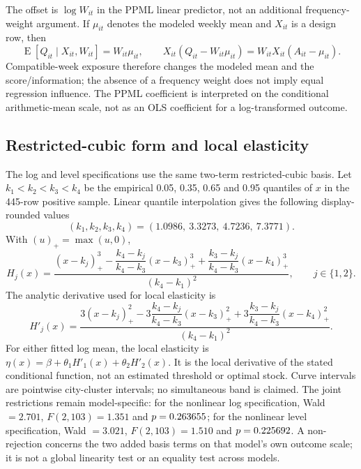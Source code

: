 The offset is $\log W_{it}$ in the PPML linear predictor, not an additional
frequency-weight argument.  If $\mu_{it}$ denotes the modeled weekly mean and
$X_{it}$ is a design row, then
\begin{equation}
 \operatorname{E}[Q_{it}\mid X_{it},W_{it}]=W_{it}\mu_{it},\qquad
 X_{it}(Q_{it}-W_{it}\mu_{it})
 =W_{it}X_{it}(A_{it}-\mu_{it}).
 \label{eq:si-offset-equivalence}
\end{equation}
Compatible-week exposure therefore changes the modeled mean and the
score/information; the absence of a frequency weight does not imply equal
regression influence.  The PPML coefficient is interpreted on the conditional
arithmetic-mean scale, not as an OLS coefficient for a log-transformed
outcome.

\subsection{Restricted-cubic form and local elasticity}
The log and level specifications use the same two-term restricted-cubic basis.
Let $k_1<k_2<k_3<k_4$ be the empirical 0.05, 0.35, 0.65 and 0.95 quantiles of
$x$ in the 445-row positive sample.  Linear quantile interpolation gives the following display-rounded values
\[
(k_1,k_2,k_3,k_4)=(1.0986,\ 3.3273,\ 4.7236,\ 7.3771).
\]
With $(u)_+=\max(u,0)$,
\begin{equation}
 H_j(x)=\frac{(x-k_j)_+^3-
 \dfrac{k_4-k_j}{k_4-k_3}(x-k_3)_+^3+
 \dfrac{k_3-k_j}{k_4-k_3}(x-k_4)_+^3}
 {(k_4-k_1)^2},\qquad j\in\{1,2\}.
 \label{eq:si-rcs}
\end{equation}
The analytic derivative used for local elasticity is
\begin{equation}
 H'_j(x)=\frac{3(x-k_j)_+^2-
 3\dfrac{k_4-k_j}{k_4-k_3}(x-k_3)_+^2+
 3\dfrac{k_3-k_j}{k_4-k_3}(x-k_4)_+^2}
 {(k_4-k_1)^2}.
 \label{eq:si-rcs-derivative}
\end{equation}
For either fitted log mean, the local elasticity is
$\eta(x)=\beta+\theta_1H'_1(x)+\theta_2H'_2(x)$.  It is the local derivative
of the stated conditional function, not an estimated threshold or optimal
stock.  Curve intervals are pointwise city-cluster intervals; no simultaneous
band is claimed.  The joint restrictions remain model-specific: for the
nonlinear log specification, Wald $=2.701$, $F(2,103)=1.351$ and
$p=0.263655$; for the nonlinear level specification, Wald $=3.021$,
$F(2,103)=1.510$ and $p=0.225692$.  A non-rejection concerns the two
added basis terms on that model's own outcome scale; it is not a global
linearity test or an equality test across models.

